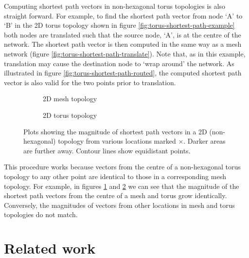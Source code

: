 			Computing shortest path vectors in non-hexagonal torus topologies is also
			straight forward. For example, to find the shortest path vector from node
			`A' to `B' in the 2D torus topology shown in figure
			\ref{fig:torus-shortest-path-example} both nodes are translated such that
			the source node, `A', is at the centre of the network. The shortest path
			vector is then computed in the same way as a mesh network (figure
			\ref{fig:torus-shortest-path-translate}). Note that, as in this example,
			translation may cause the destination node to `wrap around' the network.
			As illustrated in figure \ref{fig:torus-shortest-path-routed}, the
			computed shortest path vector is also valid for the two points prior to
			translation.
			
			\begin{figure}
				\center
				
				\begin{subfigure}{\linewidth}
					\center
					\caption{2D mesh topology}
					\label{fig:distance-map-mesh}
				\end{subfigure}
				
				\vspace{1em}
				
				\begin{subfigure}{\linewidth}
					\center
					\caption{2D torus topology}
					\label{fig:distance-map-torus}
				\end{subfigure}
				
				\caption{Plots showing the magnitude of shortest path vectors in a 2D
				(non-hexagonal) topology from various locations marked
				{\color{red}$\times$}.  Darker areas are further away. Contour lines show
				equidistant points.}
				
				\label{fig:distance-map}
			\end{figure}
			
			This procedure works because vectors from the centre of a non-hexagonal
			torus topology to any other point are identical to those in a
			corresponding mesh topology. For example, in figures
			\ref{fig:distance-map-mesh} and \ref{fig:distance-map-torus} we can see
			that the magnitude of the shortest path vectors from the centre of a mesh
			and torus grow identically. Conversely, the magnitudes of vectors from
			other locations in mesh and torus topologies do not match.
		
	\section{Related work}
		
